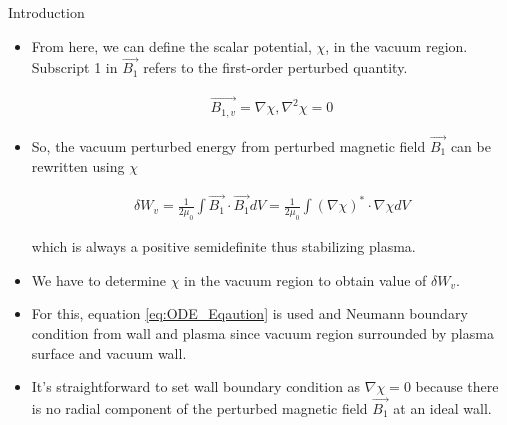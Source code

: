\documentclass[8pt]{beamer}
\begin{document}
\begin{frame}{\color{white}Introduction}
\begin{itemize}

    \item From here, we can define the scalar potential, $\chi$, in the vacuum region. Subscript 1 in $\vec{B_1}$ refers to the first-order perturbed quantity.

    \begin{align}
        \vec{B_{1,v}} = \nabla \chi , \nabla^2 \chi = 0 \label{eq:ODE_Eqaution}
    \end{align}

    \item So, the vacuum perturbed energy from perturbed magnetic field $\vec{B_1}$ can be rewritten using $\chi$
    
    \begin{align}
        \delta W_v = \frac{1}{2\mu_0} \int \vec{B_1} \cdot \vec{B_1} dV = \frac{1}{2\mu_0} \int (\nabla \chi )^* \cdot \nabla \chi dV \label{eq:3}
    \end{align}

    which is always a positive semidefinite thus stabilizing plasma. 
    
    \item We have to determine $\chi$ in the vacuum region to obtain value of $\delta W_v$. 
    
    \item For this, equation \eqref{eq:ODE_Eqaution} is used and Neumann boundary condition from wall and plasma since vacuum region surrounded by plasma surface and vacuum wall. 
    \item It's straightforward to set wall boundary condition as $\nabla \chi = 0$ because there is no radial component of the perturbed magnetic field $\vec{B_1}$ at an ideal wall.
\end{itemize}
\end{frame}
\end{document}
